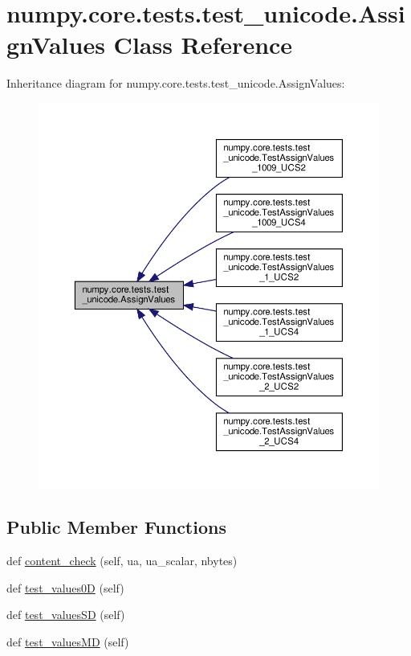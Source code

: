 \hypertarget{classnumpy_1_1core_1_1tests_1_1test__unicode_1_1AssignValues}{}\section{numpy.\+core.\+tests.\+test\+\_\+unicode.\+Assign\+Values Class Reference}
\label{classnumpy_1_1core_1_1tests_1_1test__unicode_1_1AssignValues}


Inheritance diagram for numpy.\+core.\+tests.\+test\+\_\+unicode.\+Assign\+Values\+:
\nopagebreak
\begin{figure}[H]
\begin{center}
\leavevmode
\includegraphics[width=350pt]{classnumpy_1_1core_1_1tests_1_1test__unicode_1_1AssignValues__inherit__graph}
\end{center}
\end{figure}
\subsection*{Public Member Functions}
\begin{DoxyCompactItemize}
\item 
def \hyperlink{classnumpy_1_1core_1_1tests_1_1test__unicode_1_1AssignValues_adaf5613088f71a16d953e0569af6b5c6}{content\+\_\+check} (self, ua, ua\+\_\+scalar, nbytes)
\item 
def \hyperlink{classnumpy_1_1core_1_1tests_1_1test__unicode_1_1AssignValues_a5d66967801b91ea1b4bc5120251880a2}{test\+\_\+values0D} (self)
\item 
def \hyperlink{classnumpy_1_1core_1_1tests_1_1test__unicode_1_1AssignValues_a09f06720b9d91b4656fcb8e0dff99e63}{test\+\_\+values\+SD} (self)
\item 
def \hyperlink{classnumpy_1_1core_1_1tests_1_1test__unicode_1_1AssignValues_accde5d90ea3ee5ad65ba6c922d580db7}{test\+\_\+values\+MD} (self)
\end{DoxyCompactItemize}
